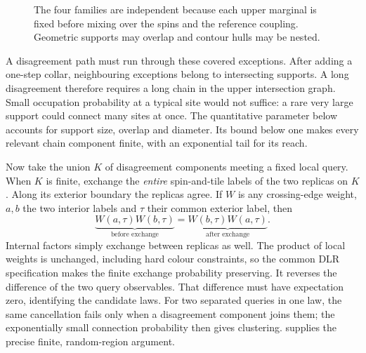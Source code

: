 \documentclass[11pt,reqno]{amsart}
\numberwithin{equation}{section}
\theoremstyle{definition}
\theoremstyle{remark}
\begin{document}
\begin{figure}[ht]
\centering
{}
\caption{The four families are independent because each upper marginal is fixed before mixing over the spins and the reference coupling. Geometric supports may overlap and contour hulls may be nested.}
\label{fig:fourfamilies}
\end{figure}

A disagreement path must run through these covered exceptions. After adding a one-step collar, neighbouring exceptions belong to intersecting supports. A long disagreement therefore requires a long chain in the upper intersection graph. Small occupation probability at a typical site would not suffice: a rare very large support could connect many sites at once. The quantitative parameter below accounts for support size, overlap and diameter. Its bound below one makes every relevant chain component finite, with an exponential tail for its reach.

Now take the union $K$ of disagreement components meeting a fixed local query. When $K$ is finite, exchange the \emph{entire} spin-and-tile labels of the two replicas on $K$. Along its exterior boundary the replicas agree. If $W$ is any crossing-edge weight, $a,b$ the two interior labels and $\tau$ their common exterior label, then
\[
 \underbrace{W(a,\tau)W(b,\tau)}_{\text{before exchange}}
 =\underbrace{W(b,\tau)W(a,\tau)}_{\text{after exchange}}.
\]
Internal factors simply exchange between replicas as well. The product of local weights is unchanged, including hard colour constraints, so the common DLR specification makes the finite exchange probability preserving. It reverses the difference of the two query observables. That difference must have expectation zero, identifying the candidate laws. For two separated queries in one law, the same cancellation fails only when a disagreement component joins them; the exponentially small connection probability then gives clustering.  supplies the precise finite, random-region argument.
\end{document}
